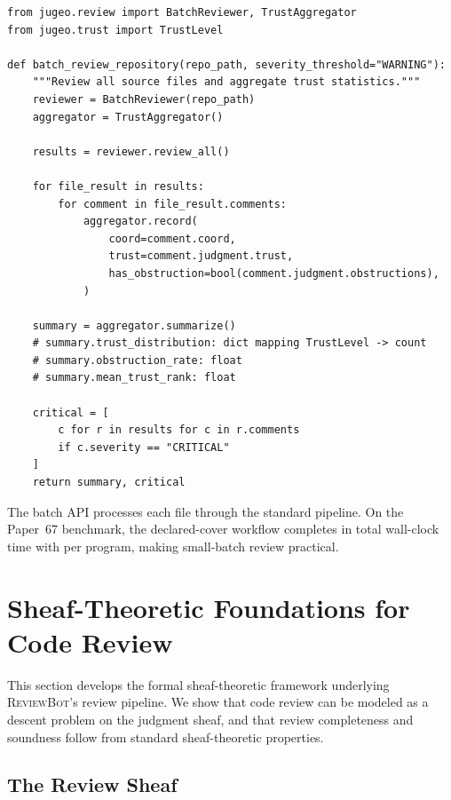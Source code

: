 \documentclass[11pt]{article}
\newcommand{\ReviewBot}{\textsc{ReviewBot}}
\begin{document}
\begin{lstlisting}[style=jugeo-python]
from jugeo.review import BatchReviewer, TrustAggregator
from jugeo.trust import TrustLevel

def batch_review_repository(repo_path, severity_threshold="WARNING"):
    """Review all source files and aggregate trust statistics."""
    reviewer = BatchReviewer(repo_path)
    aggregator = TrustAggregator()

    results = reviewer.review_all()

    for file_result in results:
        for comment in file_result.comments:
            aggregator.record(
                coord=comment.coord,
                trust=comment.judgment.trust,
                has_obstruction=bool(comment.judgment.obstructions),
            )

    summary = aggregator.summarize()
    # summary.trust_distribution: dict mapping TrustLevel -> count
    # summary.obstruction_rate: float
    # summary.mean_trust_rank: float

    critical = [
        c for r in results for c in r.comments
        if c.severity == "CRITICAL"
    ]
    return summary, critical
\end{lstlisting}

The batch API processes each file through the standard pipeline. On the
Paper~67 benchmark, the declared-cover workflow completes in
\ppLXVIItimeTotal{} total wall-clock time with \ppLXVIItimeMean{} per
program, making small-batch review practical.

\section{Sheaf-Theoretic Foundations for Code Review}\label{sec:sheaf-theory}

This section develops the formal sheaf-theoretic framework underlying
\ReviewBot{}'s review pipeline. We show that code review can be modeled
as a descent problem on the judgment sheaf, and that review completeness
and soundness follow from standard sheaf-theoretic properties.

\subsection{The Review Sheaf}
\end{document}

